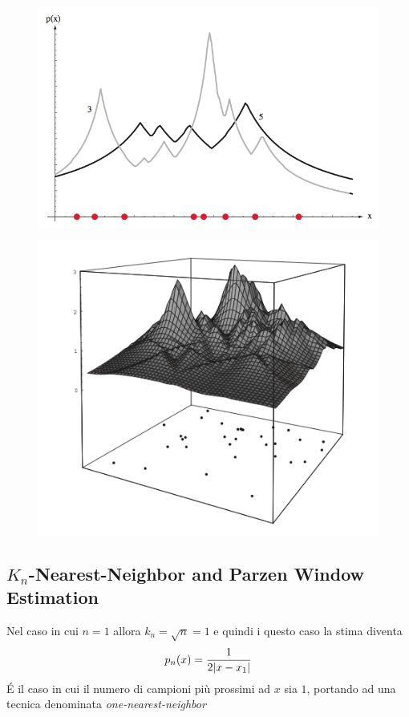 \begin{figure}
\centering
\includegraphics[scale=0.33]{img/knn1.png}
\caption{}
\label{knn1}
\end{figure}

\begin{figure}
\centering
\includegraphics[scale=0.5]{img/knn2.png}
\caption{}
\label{knn2}
\end{figure}

\subsection{$K_n$-Nearest-Neighbor and Parzen Window Estimation }
Nel caso in cui $n=1$ allora $k_n = \sqrt{n} = 1$ e quindi i questo caso la stima diventa
\begin{equation}
p_n(x) = \frac{1}{2\lvert x-x_1\rvert}
\end{equation}
\'E il caso in cui il numero di campioni più prossimi ad $x$ sia $1$, portando ad una tecnica denominata \emph{one-nearest-neighbor}

